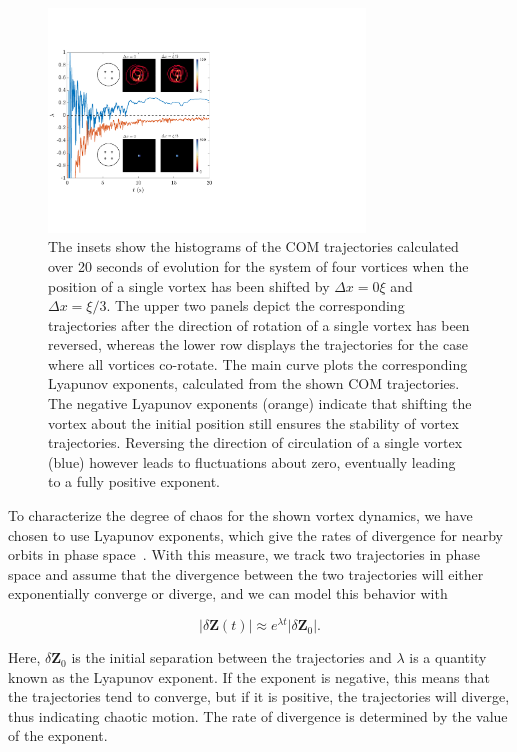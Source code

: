 \begin{figure}
\center \includegraphics[width=0.75\textwidth]{data/2d/lyap/lyap}

\caption{
The insets show the histograms of the COM trajectories calculated over 20 seconds of evolution for the system of four vortices when the position of a single vortex has been shifted by $\Delta x=0\xi$ and $\Delta x=\xi/3$.
The upper two panels depict the corresponding trajectories after the direction of rotation of a single vortex has been reversed, whereas the lower row displays the trajectories for the case where all vortices co-rotate.
The main curve plots the corresponding Lyapunov exponents,  calculated from the shown COM trajectories. 
The negative Lyapunov exponents (orange) indicate that shifting the vortex about the initial position still ensures the stability of vortex trajectories. Reversing the direction of circulation of a single vortex (blue) however leads to fluctuations about zero, eventually leading to a fully positive exponent. 
}
\label{fig:lyap}
\end{figure}


To characterize the degree of chaos for the shown vortex dynamics, we have chosen to use Lyapunov exponents, which give the rates of divergence for nearby orbits in phase space~\cite{wolf1985}.
With this measure, we track two trajectories in phase space and assume that the divergence between the two trajectories will either exponentially converge or diverge, and we can model this behavior with

\begin{equation}
|\delta\mathbf{Z}(t)| \approx e^{\lambda t} |\delta \mathbf{Z}_0|.
\end{equation}

\noindent Here, $\delta\mathbf{Z}_0$ is the initial separation between the trajectories and $\lambda$ is a quantity known as the Lyapunov exponent.
If the exponent is negative, this means that the trajectories tend to converge, but if it is positive, the trajectories will diverge, thus indicating chaotic motion.
The rate of divergence is determined by the value of the exponent.


